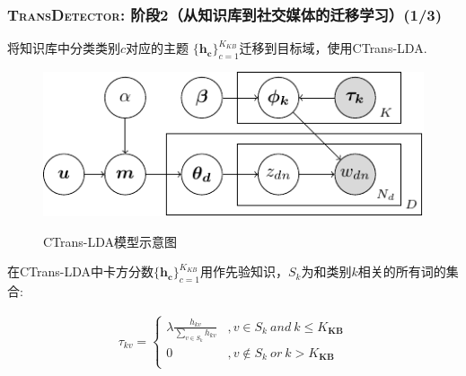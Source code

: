 \begin{frame}
\frametitle{\noindent \textsc{TransDetector}: 阶段2（从知识库到社交媒体的迁移学习）(1/3)}
将知识库中分类类别$c$对应的主题 \(\{\bm{h_c}\}_{c=1}^{K_{KB}}\)迁移到目标域，使用CTrans-LDA.
\vspace{-3mm}
\begin{figure}[h]
		\setlength{\abovecaptionskip}{0.cm}
        \setlength{\belowcaptionskip}{0.cm}
        \centering
 		\caption{CTrans-LDA模型示意图}
        \includegraphics[width=0.6\columnwidth]{img/lda_tikz.pdf}
        \label{fig:hood}
\end{figure}

在CTrans-LDA中卡方分数\(\{\bm{h_c}\}_{c=1}^{K_{KB}}\)用作先验知识，$S_k$为和类别$k$相关的所有词的集合:
\setlength{\abovedisplayskip}{0pt}
\setlength{\belowdisplayskip}{0pt}
\begin{scriptsize}
\begin{equation}
\label{eq:wikiPrior}
\begin{aligned}
\tau_{kv}=
\left\{ \begin{aligned}
\lambda \frac{h_{kv}}{\sum_{v\in S_{k}}h_{kv}} &,v\in S_{k}\ and  \ k \leq K_{\bm{KB}} \\
0&,v \notin S_{k} \ or \ k > K_{\bm{KB}} \\
\end{aligned}\right.
\end{aligned}
\end{equation}
\end{scriptsize}
\end{frame}


